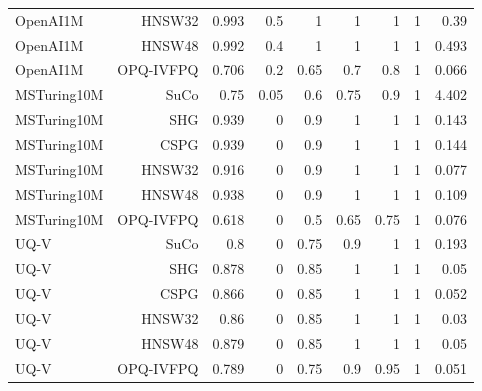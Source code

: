 \begin{table}[t]
\begin{tabular}{lrrrrrrrr}
OpenAI1M & HNSW32 & 0.993 & 0.5 & 1 & 1 & 1 & 1 & 0.39 \\
OpenAI1M & HNSW48 & 0.992 & 0.4 & 1 & 1 & 1 & 1 & 0.493 \\
OpenAI1M & OPQ-IVFPQ & 0.706 & 0.2 & 0.65 & 0.7 & 0.8 & 1 & 0.066 \\
MSTuring10M & SuCo & 0.75 & 0.05 & 0.6 & 0.75 & 0.9 & 1 & 4.402 \\
MSTuring10M & SHG & 0.939 & 0 & 0.9 & 1 & 1 & 1 & 0.143 \\
MSTuring10M & CSPG & 0.939 & 0 & 0.9 & 1 & 1 & 1 & 0.144 \\
MSTuring10M & HNSW32 & 0.916 & 0 & 0.9 & 1 & 1 & 1 & 0.077 \\
MSTuring10M & HNSW48 & 0.938 & 0 & 0.9 & 1 & 1 & 1 & 0.109 \\
MSTuring10M & OPQ-IVFPQ & 0.618 & 0 & 0.5 & 0.65 & 0.75 & 1 & 0.076 \\
UQ-V & SuCo & 0.8 & 0 & 0.75 & 0.9 & 1 & 1 & 0.193 \\
UQ-V & SHG & 0.878 & 0 & 0.85 & 1 & 1 & 1 & 0.05 \\
UQ-V & CSPG & 0.866 & 0 & 0.85 & 1 & 1 & 1 & 0.052 \\
UQ-V & HNSW32 & 0.86 & 0 & 0.85 & 1 & 1 & 1 & 0.03 \\
UQ-V & HNSW48 & 0.879 & 0 & 0.85 & 1 & 1 & 1 & 0.05 \\
UQ-V & OPQ-IVFPQ & 0.789 & 0 & 0.75 & 0.9 & 0.95 & 1 & 0.051 \\
\bottomrule
\end{tabular}
\end{table}
